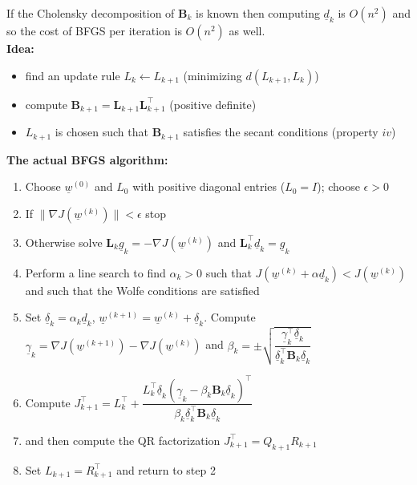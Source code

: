 If the Cholensky decomposition of $\mathbf{B}_k$ is known then computing $\underline{d}_k$ is $O(n^2)$ and so the cost of BFGS per iteration is $O(n^2)$ as well.\\

\textbf{Idea: } 
\begin{itemize}
    \item find an update rule $L_k \leftarrow L_{k+1}$ (minimizing $d(L_{k+1}, L_k)$)
    \item compute $\mathbf{B}_{k+1} = \mathbf{L}_{k+1}\mathbf{L}_{k+1}^\intercal$ (positive definite)
    \item $L_{k+1}$ is chosen such that $\mathbf{B}_{k+1}$ satisfies the secant conditions (property $iv$)
\end{itemize}

\textbf{The actual BFGS algorithm:}
\begin{enumerate}
    \item Choose $\underline{w}^{(0)}$ and $L_0$ with positive diagonal entries ($L_0 = I$); choose $\epsilon > 0$
    \item If $\|\nabla J(\underline{w}^{(k)})\| < \epsilon$ stop
    \item Otherwise solve $\mathbf{L}_k \underline{g}_k = - \nabla J(\underline{w}^{(k)})$ and $\mathbf{L}_k^\intercal \underline{d}_k = \underline{g}_k$
    \item Perform a line search to find $\alpha_k > 0$ such that $J(\underline{w}^{(k)} +  \alpha\underline{d}_k) < J(\underline{w}^{(k)})$ and such that the Wolfe conditions are satisfied
    \item Set $\underline{\delta}_k = \alpha_k \underline{d}_k$, $\underline{w}^{(k+1)} = \underline{w}^{(k)} + \underline{\delta}_k$. Compute $\underline{\gamma}_k = \nabla J(\underline{w}^{(k+1)}) - \nabla J(\underline{w}^{(k)})$ and $\beta_k = \pm \sqrt{\dfrac{\underline{\gamma}_k^\intercal\underline{\delta}_k}{\underline{\delta}_k^\intercal \mathbf{B}_k \underline{\delta}_k}}$
    \item Compute $J_{k+1}^\intercal = L_k^\intercal + \dfrac{L_k^\intercal \underline{\delta}_k (\underline{\gamma}_k - \beta_k \mathbf{B}_k \underline{\delta}_k)^\intercal}{\beta_k \underline{\delta}_k^\intercal \mathbf{B}_k \underline{\delta}_k}$ 
    \item and then compute the QR factorization $J_{k+1}^\intercal = Q_{k+1}R_{k+1}$ 
    \item Set $L_{k+1} = R_{k+1}^\intercal$ and return to step 2
\end{enumerate}

